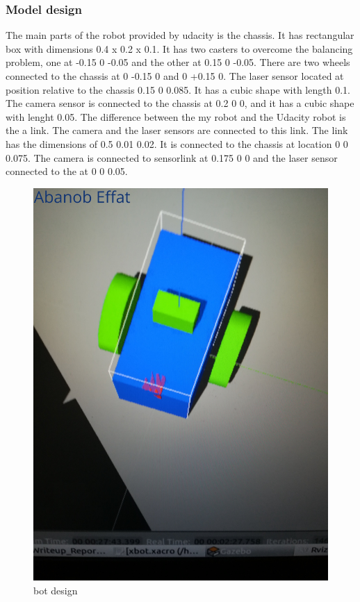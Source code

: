 \documentclass[10pt,journal,compsoc]{IEEEtran}
\begin{document}
\subsubsection{Model design}
The main parts of the robot provided by udacity is the chassis. It has rectangular box with dimensions 0.4 x 0.2 x 0.1. It has two casters to overcome the balancing problem, one at -0.15 0 -0.05 and the other at 0.15 0 -0.05. There are two wheels connected to the chassis at 0 -0.15 0 and 0 +0.15 0. 
The laser sensor located at position relative to the chassis 0.15 0 0.085. It has a cubic shape with length 0.1. The camera sensor is connected to the chassis at 0.2 0 0, and it has a cubic shape with lenght 0.05.
The difference between the my robot and the Udacity robot is the a link. The camera and the laser sensors are connected to this link. The link has the dimensions of 0.5 0.01 0.02. It is connected to the chassis at location 0 0 0.075. The camera is connected to sensor\textunderscore link at 0.175 0 0 and the laser sensor connected to the at 0 0 0.05.
\begin{figure}[thpb]
      \centering
      \includegraphics[width=\linewidth]{fig/fin_bot.jpg}
      \caption{bot design}
\end{figure}
\end{document}
